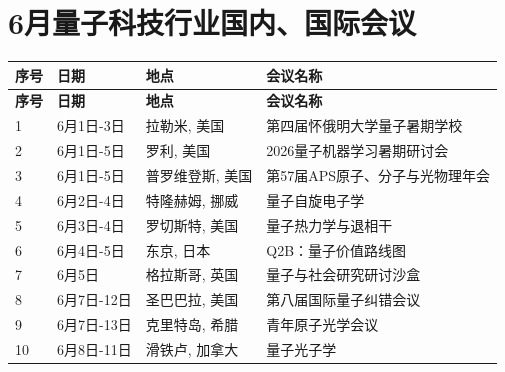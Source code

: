 \documentclass[12pt,a4paper]{ctexart}
\begin{document}
{
    \newpage
    \section*{ 6月量子科技行业国内、国际会议}
    \scriptsize
    \begin{longtable}{C{0.8cm}L{2.5cm}L{3cm}L{7cm}}
        \toprule[1.5pt]
        \textbf{序号} & \textbf{日期} & \textbf{地点} & \textbf{会议名称} \\
        \midrule
        \endfirsthead
        \toprule
        \textbf{序号} & \textbf{日期} & \textbf{地点} & \textbf{会议名称} \\
        \midrule
        \endhead
        \bottomrule
        \endfoot
        
        1 & 6月1日-3日 & 拉勒米, 美国 & 第四届怀俄明大学量子暑期学校 \\
        \midrule[0.05pt]
        
        2 & 6月1日-5日 & 罗利, 美国 & 2026量子机器学习暑期研讨会 \\
        \midrule[0.05pt]
        
        3 & 6月1日-5日 & 普罗维登斯, 美国 & 第57届APS原子、分子与光物理年会 \\
        \midrule[0.05pt]
        
        4 & 6月2日-4日 & 特隆赫姆, 挪威 & 量子自旋电子学 \\
        \midrule[0.05pt]
        
        5 & 6月3日-4日 & 罗切斯特, 美国 & 量子热力学与退相干 \\
        \midrule[0.05pt]
        
        6 & 6月4日-5日 & 东京, 日本 & Q2B：量子价值路线图 \\
        \midrule[0.05pt]
        
        7 & 6月5日 & 格拉斯哥, 英国 & 量子与社会研究研讨沙盒 \\
        \midrule[0.05pt]
        
        8 & 6月7日-12日 & 圣巴巴拉, 美国 & 第八届国际量子纠错会议 \\
        \midrule[0.05pt]
        
        9 & 6月7日-13日 & 克里特岛, 希腊 & 青年原子光学会议 \\
        \midrule[0.05pt]
        
        10 & 6月8日-11日 & 滑铁卢, 加拿大 & 量子光子学 \\
        \midrule[0.05pt]
        

\end{longtable}}
\end{document}
